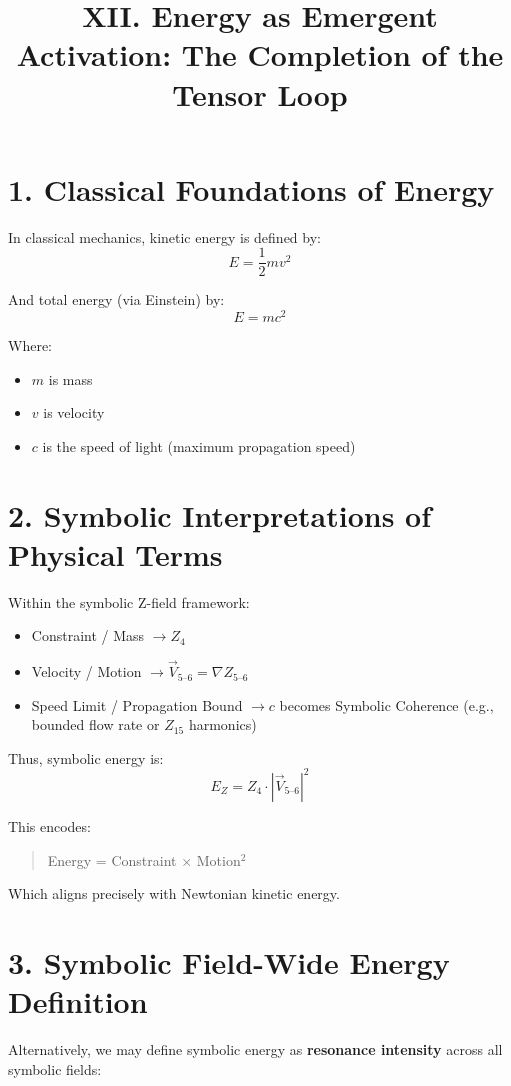 \documentclass[12pt]{article}
\title{XII. Energy as Emergent Activation: The Completion of the Tensor Loop}
\author{}
\date{}
\begin{document}
\maketitle

\section*{1. Classical Foundations of Energy}

In classical mechanics, kinetic energy is defined by:
\[
E = \frac{1}{2}mv^2
\]

And total energy (via Einstein) by:
\[
E = mc^2
\]

Where:
\begin{itemize}
  \item \( m \) is mass
  \item \( v \) is velocity
  \item \( c \) is the speed of light (maximum propagation speed)
\end{itemize}

\section*{2. Symbolic Interpretations of Physical Terms}

Within the symbolic Z-field framework:
\begin{itemize}
  \item Constraint / Mass \( \rightarrow Z_4 \)
  \item Velocity / Motion \( \rightarrow \vec{V}_{5\text{--}6} = \nabla Z_{5\text{--}6} \)
  \item Speed Limit / Propagation Bound \( \rightarrow c \) becomes Symbolic Coherence (e.g., bounded flow rate or \( Z_{15} \) harmonics)
\end{itemize}

Thus, symbolic energy is:
\[
E_Z = Z_4 \cdot \left| \vec{V}_{5\text{--}6} \right|^2
\]

This encodes:
\begin{quote}
Energy = Constraint × Motion\(^2\)
\end{quote}

Which aligns precisely with Newtonian kinetic energy.

\section*{3. Symbolic Field-Wide Energy Definition}

Alternatively, we may define symbolic energy as \textbf{resonance intensity} across all symbolic fields:
\end{document}
